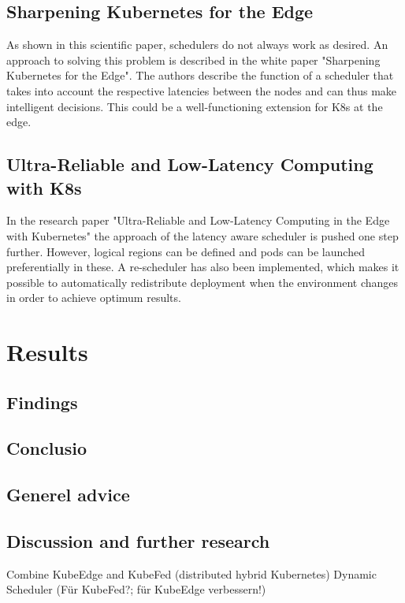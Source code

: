 \documentclass[MSC,Master,english]{twbook}%
\begin{document}
\section{Sharpening Kubernetes for the Edge}
\label{sec:sharp-k8s-edge}
As shown in this scientific paper, schedulers do not always work as desired. An approach to solving this problem is described in the white paper "Sharpening Kubernetes for the Edge"\cite{k8s-sharping-edge}. The authors describe the function of a scheduler that takes into account the respective latencies between the nodes and can thus make intelligent decisions. This could be a well-functioning extension for K8s at the edge.


\section{Ultra-Reliable and Low-Latency Computing with K8s}
\label{sec:ultra-low-k8s}
In the research paper "Ultra-Reliable and Low-Latency Computing in the Edge with Kubernetes"\cite{k8s-latency-sched} the approach of the latency aware scheduler is pushed one step further. However, logical regions can be defined and pods can be launched preferentially in these. A re-scheduler has also been implemented, which makes it possible to automatically redistribute deployment when the environment changes in order to achieve optimum results.

\chapter{Results}
\label{chap:results}

\section{Findings}
\label{sec:findings}

\section{Conclusio}
\label{sec:conclusio}
\section{Generel advice}

\section{Discussion and further research}
\label{sec:discuss}
Combine KubeEdge and KubeFed (distributed hybrid Kubernetes)
Dynamic Scheduler (Für KubeFed?; für KubeEdge verbessern!)
\end{document}
